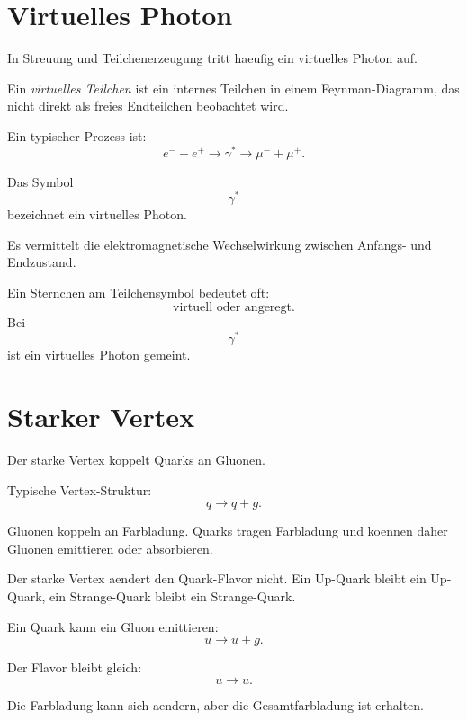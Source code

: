 \section{Virtuelles Photon}

In Streuung und Teilchenerzeugung tritt haeufig ein virtuelles Photon auf.

\begin{definitionbox}
Ein \emph{virtuelles Teilchen} ist ein internes Teilchen in einem Feynman-Diagramm,
das nicht direkt als freies Endteilchen beobachtet wird.
\end{definitionbox}

\begin{formulabox}
Ein typischer Prozess ist:
\[
    e^- + e^+
    \rightarrow
    \gamma^*
    \rightarrow
    \mu^- + \mu^+.
\]
\end{formulabox}

\begin{conceptbox}
Das Symbol
\[
    \gamma^*
\]
bezeichnet ein virtuelles Photon.

Es vermittelt die elektromagnetische Wechselwirkung zwischen Anfangs- und Endzustand.
\end{conceptbox}

\begin{examtipbox}
Ein Sternchen am Teilchensymbol bedeutet oft:
\[
    \text{virtuell oder angeregt}.
\]
Bei
\[
    \gamma^*
\]
ist ein virtuelles Photon gemeint.
\end{examtipbox}

\section{Starker Vertex}

Der starke Vertex koppelt Quarks an Gluonen.

\begin{formulabox}
Typische Vertex-Struktur:
\[
    q \rightarrow q + g.
\]
\end{formulabox}

\begin{conceptbox}
Gluonen koppeln an Farbladung.
Quarks tragen Farbladung und koennen daher Gluonen emittieren oder absorbieren.

Der starke Vertex aendert den Quark-Flavor nicht.
Ein Up-Quark bleibt ein Up-Quark, ein Strange-Quark bleibt ein Strange-Quark.
\end{conceptbox}

\begin{examplebox}
Ein Quark kann ein Gluon emittieren:
\[
    u \rightarrow u + g.
\]

Der Flavor bleibt gleich:
\[
    u \rightarrow u.
\]

Die Farbladung kann sich aendern, aber die Gesamtfarbladung ist erhalten.
\end{examplebox}

